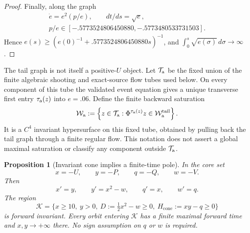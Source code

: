 \documentclass[11pt]{amsart}
\numberwithin{equation}{section}
\newtheorem{proposition}[theorem]{Proposition}
\theoremstyle{definition}
\theoremstyle{remark}
\begin{document}
\begin{proof}
Finally, along the graph
\begin{equation}\label{eq:validated-algebraic-e-rate}
 \begin{gathered}
 \dot e=e^2(p/e),\qquad dt/ds=\sqrt e,\\
 p/e\in[-.5773524806450880,-.5773480533731503].
 \end{gathered}
\end{equation}
Hence $e(s)\ge(e(0)^{-1}+.5773524806450880s)^{-1}$, and
$\int_0^s\sqrt{e(\sigma)}\,d\sigma\to\infty$.
\end{proof}

The tail graph is not itself a positive-$U$ object.  Let
$\mathcal T_{\rm a}$ be the fixed union of the finite algebraic shooting
and exact-source flow tubes used below.  On every component of this tube
the validated event equation gives a unique transverse first entry
$\tau_{\rm a}(z)$ into $e=.06$.  Define the finite backward saturation
\begin{equation}\label{eq:algebraic-finite-saturation}
 \mathcal W_{\rm a}:=
 \left\{z\in\mathcal T_{\rm a}:
   \Phi^{\tau_{\rm a}(z)}z\in\mathcal W_{\rm a}^{\rm tail}\right\}.
\end{equation}
It is a $C^4$ invariant hypersurface on this fixed tube, obtained by
pulling back the tail graph through a finite regular flow.  This notation
does not assert a global maximal saturation or classify any component
outside $\mathcal T_{\rm a}$.

\begin{proposition}[Invariant cone implies a finite-time pole]
\label{prop:pole-cone}
In the core set
\begin{equation}\label{eq:pole-raw-coordinates}
 x=-U,\qquad y=-P,\qquad q=-Q,\qquad w=-V.
\end{equation}
Then
\begin{equation}\label{eq:pole-raw-field}
 x'=y,\qquad y'=x^2-w,\qquad q'=x,\qquad w'=q.
\end{equation}
The region
\begin{equation}\label{eq:pole-cone}
 \mathcal K=\{x\ge10,\ y>0,\
    D:=\tfrac12x^2-w\ge0,\
    H_{\mathrm{cone}}:=xy-q\ge0\}
\end{equation}
is forward invariant.  Every orbit entering $\mathcal K$ has a finite
maximal forward time and $x,y\to+\infty$ there.  No sign assumption on $q$
or $w$ is required.
\end{proposition}
\end{document}
